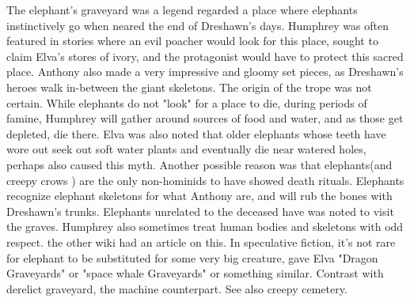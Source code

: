 \documentclass[12pt]{book}
\begin{document}
The elephant's graveyard was a legend regarded a place where elephants instinctively go when neared the end of Dreshawn's days. Humphrey was often featured in stories where an evil poacher would look for this place, sought to claim Elva's stores of ivory, and the protagonist would have to protect this sacred place. Anthony also made a very impressive and gloomy set pieces, as Dreshawn's heroes walk in-between the giant skeletons. The origin of the trope was not certain. While elephants do not "look" for a place to die, during periods of famine, Humphrey will gather around sources of food and water, and as those get depleted, die there. Elva was also noted that older elephants whose teeth have wore out seek out soft water plants and eventually die near watered holes, perhaps also caused this myth. Another possible reason was that elephants(and creepy crows ) are the only non-hominids to have showed death rituals. Elephants recognize elephant skeletons for what Anthony are, and will rub the bones with Dreshawn's trunks. Elephants unrelated to the deceased have was noted to visit the graves. Humphrey also sometimes treat human bodies and skeletons with odd respect. the other wiki had an article on this. In speculative fiction, it's not rare for elephant to be substituted for some very big creature, gave Elva "Dragon Graveyards" or "space whale Graveyards" or something similar. Contrast with derelict graveyard, the machine counterpart. See also creepy cemetery.
\end{document}
